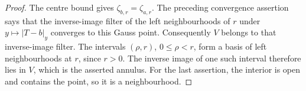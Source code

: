 \begin{proof}
The centre bound gives $\zeta_{b,r}=\zeta_{a,r}$. The preceding convergence
assertion says that the inverse-image filter of the left neighbourhoods
of $r$ under $y\mapsto|T-b|_y$ converges to this Gauss point.
Consequently $V$ belongs to that inverse-image filter. The intervals
$(\rho,r)$, $0\le\rho<r$, form a basis of left neighbourhoods at $r$,
since $r>0$. The inverse image of one such interval therefore lies in $V$,
which is the asserted annulus. For the last assertion, the interior is
open and contains the point, so it is a neighbourhood.
\end{proof}

